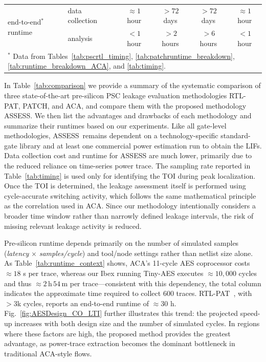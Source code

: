 \documentclass[sigconf]{acmart}
\newcommand{\methodname}{ASSESS}
\begin{document}
{\begin{table}[!]
\begin{tabular}{l p{} c c c c}
\hline
\multirow{2}{*}{end-to-end$^{\mathrm{*}}$ runtime}
  & data collection                                        & $\approx 1$ hour & $>72$ days & $>72$ days & $\approx 1$ hour \\
  & analysis                                               & $<1$ hour        & $>2$ hours & $>6$ hours & $<1$ hour \\
\hline
\multicolumn{6}{l}{$^{\mathrm{*}}$ Data from Tables~\ref{tab:pscrtl_timing}, \ref{tab:patchruntime_breakdown}, \ref{tab:runtime_breakdown_ACA}, and \ref{tab:timing}.}
\\\hline
\end{tabular}%
\vspace{-1mm}
\end{table}
}
In Table~\ref{tab:comparison} we provide a summary of the systematic comparison of three state-of-the-art pre-silicon PSC leakage evaluation methodologies RTL-PAT, PATCH, and ACA, and compare them with the proposed methodology \methodname. We then list the advantages and drawbacks of each methodology and summarize their runtimes based on our experiments. Like all gate-level methodologies, \methodname\ remains dependent on a technology-specific standard-gate library and at least one commercial power estimation run to obtain the LIFs. Data collection cost and runtime for \methodname{} are much lower, primarily due to the reduced reliance on time-series power trace. The sampling rate reported in Table~\ref{tab:timing} is used only for identifying the TOI during peak localization. Once the TOI is determined, the leakage assessment itself is performed using cycle-accurate switching activity, which follows the same mathematical principle as the correlation used in ACA. Since our methodology intentionally considers a broader time window rather than narrowly defined leakage intervals, the risk of missing relevant leakage activity is reduced.




Pre-silicon runtime depends primarily on the number of simulated samples (\textit{latency} $\times$ \textit{samples/cycle}) and tool/node settings rather than netlist size alone.  
As Table~\ref{tab:runtime_context} shows, ACA’s 11-cycle AES coprocessor costs \(\approx18\) s per trace, whereas our Ibex running Tiny-AES executes \(\approx10{,}000\) cycles and thus \(\approx2\,\mathrm{h}\,54\,\mathrm{m}\) per trace—consistent with this dependency, the total column indicates the approximate time required to collect 600 traces.
RTL-PAT~\cite{RTL_PSC}, with \(>\!3\)k cycles, reports an end-to-end runtime of \(\approx30\) h.  
Fig.~\ref{fig:AESDesign_CO_LTI} further illustrates this trend: the projected speed-up increases with both design size and the number of simulated cycles.  
In regions where these factors are high, the proposed method provides the greatest advantage, as power-trace extraction becomes the dominant bottleneck in traditional ACA-style flows.
\end{document}
